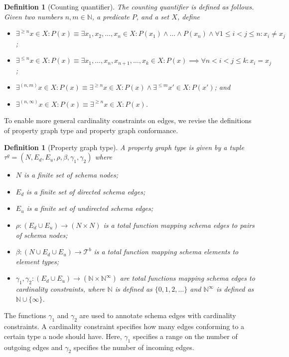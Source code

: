 \documentclass[a4paper]{article}
\newtheorem{definition}[theorem]{Definition}
\newcommand{\N}{\mathbb{N}}
\newcommand{\btypes}{\mathcal{T}^b}
\newcommand{\gtype}{\tau^g}
\begin{document}
\begin{definition}[Counting quantifier]
  The \emph{counting quantifier} is defined as follows. Given two numbers $n, m \in \N$, a predicate $P$, and a set $X$, define
  \begin{itemize}
    \item $\exists^{\geq n} x \in X : P(x) \equiv \exists x_1, x_2, \ldots, x_n \in X : P(x_1) \wedge \ldots \wedge P(x_n) \wedge \forall 1 \leq i < j \leq n : x_i \neq x_j$;
    \item $\exists^{\leq n} x \in X : P(x) \equiv \exists x_1, \ldots, x_n, x_{n+1}, \ldots, x_k \in X : P(x) \implies \forall n < i < j \leq k : x_i = x_j$;
    \item $\exists^{(n, m)} x \in X : P(x) \equiv \exists^{\geq n} x \in X : P(x) \wedge \exists^{\leq m} x' \in X : P(x')$; and
    \item $\exists^{(n, \infty)} x \in X : P(x) \equiv \exists^{\geq n} x \in X : P(x)$.
  \end{itemize}
\end{definition}

To enable more general cardinality constraints on edges, we revise the definitions of property graph type and property graph conformance.

\begin{definition}[Property graph type]
  A \emph{property graph type} is given by a tuple $\gtype = (N, E_d, E_u, \rho, \beta, \gamma_1, \gamma_2)$ where 
  \begin{itemize}
    \item $N$ is a finite set of schema nodes;
    \item $E_d$ is a finite set of directed schema edges;
    \item $E_u$ is a finite set of undirected schema edges;
    \item $\rho : (E_d \cup E_u) \to (N \times N)$ is a total function mapping schema edges to pairs of schema nodes;
    \item $\beta : (N \cup E_d \cup E_u) \to \btypes$ is a total function mapping schema elements to element types;
    \item $\gamma_1, \gamma_2 : (E_d \cup E_u) \to (\N \times \N^\infty)$ are total functions mapping schema edges to cardinality constraints, where $\N$ is defined as $\{0, 1, 2, \ldots\}$ and $\N^\infty$ is defined as $\N \cup \{\infty\}$.
  \end{itemize}
\end{definition}

The functions $\gamma_1$ and $\gamma_2$ are used to annotate schema edges with cardinality constraints. A cardinality constraint specifies how many edges conforming to a certain type a node should have. Here, $\gamma_1$ specifies a range on the number of outgoing edges and $\gamma_2$ specifies the number of incoming edges.
\end{document}
